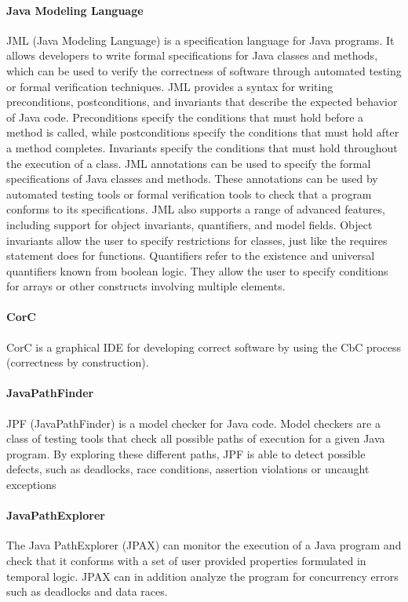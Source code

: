 \paragraph{Java Modeling Language}\citep{JML}
JML (Java Modeling Language) is a specification language for Java programs. It allows developers to write formal specifications for Java classes and methods, which can be used to verify the correctness of software through automated testing or formal verification techniques.
JML provides a syntax for writing preconditions, postconditions, and invariants that describe the expected behavior of Java code. Preconditions specify the conditions that must hold before a method is called, while postconditions specify the conditions that must hold after a method completes. Invariants specify the conditions that must hold throughout the execution of a class.
JML annotations can be used to specify the formal specifications of Java classes and methods. These annotations can be used by automated testing tools or formal verification tools to check that a program conforms to its specifications. JML also supports a range of advanced features, including support for object invariants, quantifiers, and model fields. Object invariants allow the user to specify restrictions for classes, just like the requires statement does for functions. Quantifiers refer to the existence and universal quantifiers known from boolean logic. They allow the user to specify conditions for arrays or other constructs involving multiple elements. 

\paragraph{CorC}
CorC is a graphical IDE for developing correct software by using the CbC process (correctness by construction). 
\paragraph{JavaPathFinder}
JPF (JavaPathFinder) is a model checker for Java code. Model checkers are a class of testing tools that check all possible paths of execution for a given Java program. 
By exploring these different paths, JPF is able to detect possible defects, such as deadlocks, race conditions, assertion violations or uncaught exceptions
\paragraph{JavaPathExplorer}
 The Java PathExplorer (JPAX) can monitor the execution of a Java program and check that it conforms with a set of user provided properties
 formulated in temporal logic. JPAX can in addition analyze the program for concurrency errors such as deadlocks
 and data races.\citep{HR4}
